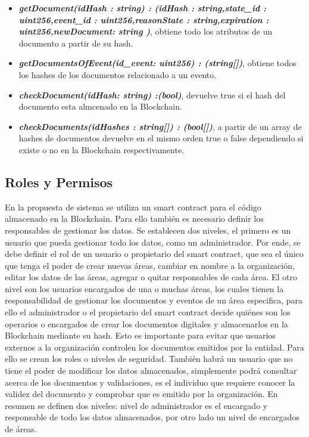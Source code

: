 \begin{itemize}
      \item \textit{\textbf{getDocument(idHash : string) : (idHash : string,state\_id : uint256,event\_id : uint256,reasonState : string,expiration : uint256,newDocument: string )}}, obtiene todo los atributos de un documento a partir de su hash.
      \item \textit{\textbf{getDocumentsOfEvent(id\_event: uint256) : (string[])}}, obtiene todos los hashes de los documentos relacionado a un evento.
      \item \textit{\textbf{checkDocument(idHash: string) :(bool)}}, devuelve true si el hash del documento esta almcenado en la Blockchain.
      \item \textit{\textbf{checkDocuments(idHashes : string[]) : (bool[])}}, a partir de un array de hashes de documentos devuelve en el mismo orden true o false dependiendo si existe o no en la Blockchain
      respectivamente.
    \end{itemize}

    \subsection{Roles y Permisos}
    En la propuesta de sistema se utiliza un smart contract para el código almacenado en la Blockchain. Para ello también es necesario definir los responsables de gestionar los datos.
    Se establecen dos niveles, el primero es un usuario que pueda gestionar todo los datos, como un administrador. 
    Por ende, se debe definir el rol de un usuario o propietario del smart contract, que sea el único que tenga el poder de crear nuevas áreas,
    cambiar en nombre a la organización, editar los datos de las áreas, agregar o quitar responsables de cada área. 
    El otro nivel son los usuarios encargados de una o muchas  áreas, los cuales tienen la responsabilidad de gestionar los documentos y eventos de un área especifica,
    para ello el administrador o el propietario del smart contract decide quiénes son los operarios o encargados de crear los documentos digitales y almacenarlos en la  Blockchain mediante
    su hash.
    Esto es importante para evitar que usuarios externos a la organización controlen los documentos emitidos por la entidad. Para ello se crean los roles o niveles de seguridad.
    También habrá un usuario que no tiene el poder de modificar los datos almacenados, simplemente podrá consultar 
    acerca de los documentos y validaciones, es el individuo que requiere conocer la validez del documento y comprobar que es emitido por la organización. 
    En resumen se definen dos niveles: nivel de administrador es el encargado y responsable de todo los datos almacenados, por otro lado un nivel de encargados de  áreas.
